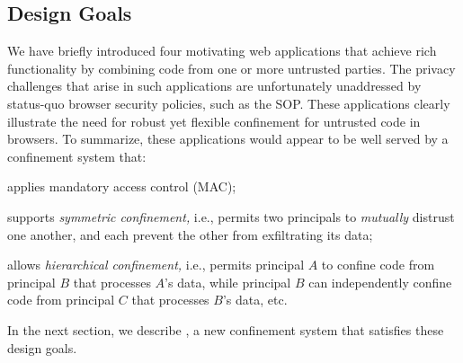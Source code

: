 \subsection{Design Goals}

We have briefly introduced four motivating web applications that
achieve rich functionality by combining code from one or more
untrusted parties. The privacy challenges that arise in such
applications are unfortunately unaddressed by status-quo browser
security policies, such as the SOP. These applications clearly
illustrate the need for robust yet flexible confinement for untrusted
code in browsers. To summarize, these applications would appear to be
well served by a confinement system that:
\begin{CompactItemize}
\item applies mandatory access control (MAC);
\item supports {\em symmetric confinement,} i.e., permits two principals to {\em
    mutually} distrust one another, and each prevent the other from
  exfiltrating its data;
\item allows {\em hierarchical confinement,} i.e., permits principal
  $A$ to confine code from principal $B$ that processes $A$'s data,
  while principal $B$ can independently confine code from principal
  $C$ that processes $B$'s data, etc.
\end{CompactItemize}
In the next section, we describe \sys{}, a new confinement system that
satisfies these design goals.
